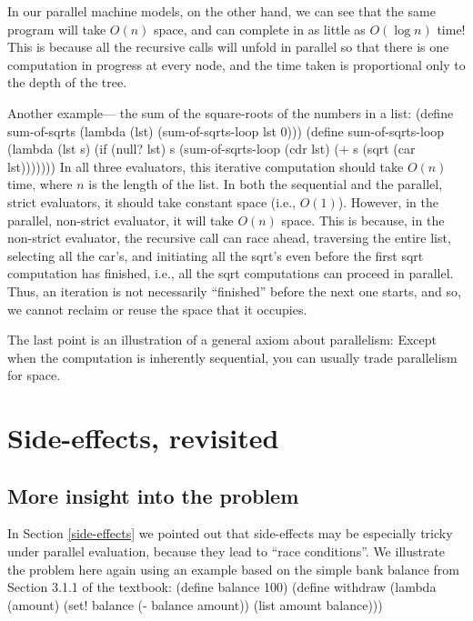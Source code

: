 In our parallel machine models, on the other hand,  we can see that the same
program will take $O(n)$ space, and can complete in as little as $O(\log n)$
time!  This is because all the recursive calls will unfold in parallel so
that there is one computation in progress at every node,  and the time taken
is proportional only to the depth of the tree.

Another example--- the sum of the square-roots of the numbers in a list:
\beginlisp
(define sum-of-sqrts (lambda (lst)
    (sum-of-sqrts-loop lst 0)))
\null
(define sum-of-sqrts-loop (lambda (lst s)
    (if (null? lst)
        s
        (sum-of-sqrts-loop (cdr lst)
                           (+ s (sqrt (car lst)))))))
\endlisp
 In all three evaluators, this iterative computation should take $O(n)$ time,
where $n$ is the length of the list.  In both the sequential and the
parallel, strict evaluators, it should take constant space (i.e., $O(1)$).
However, in the parallel, non-strict evaluator, it will take $O(n)$ space.
This is because, in the non-strict evaluator, the recursive call can race
ahead, traversing the entire list, selecting all the {\cf car}'s, and
initiating all the {\cf sqrt}'s even before the first {\cf sqrt} computation
has finished, i.e.,  all the {\cf sqrt} computations can proceed in parallel.
Thus, an iteration is not necessarily ``finished'' before the next one
starts, and so, we cannot reclaim or reuse the space that it occupies.

The last point is an illustration of a general axiom about parallelism:
Except when the computation is inherently sequential, you can usually trade
parallelism for space.


\section{Side-effects, revisited}

\label{side-effects-redux}

\subsection{More insight into the problem}

In Section \ref{side-effects} we pointed out that side-effects may be
especially tricky under parallel evaluation, because they lead to ``race
conditions''.  We illustrate the problem here again using an example based on
the simple bank balance from Section 3.1.1 of the textbook:
\beginlisp
(define balance 100)
\null
(define withdraw (lambda (amount)
    (set! balance (- balance amount))
    (list amount balance)))
\endlisp

